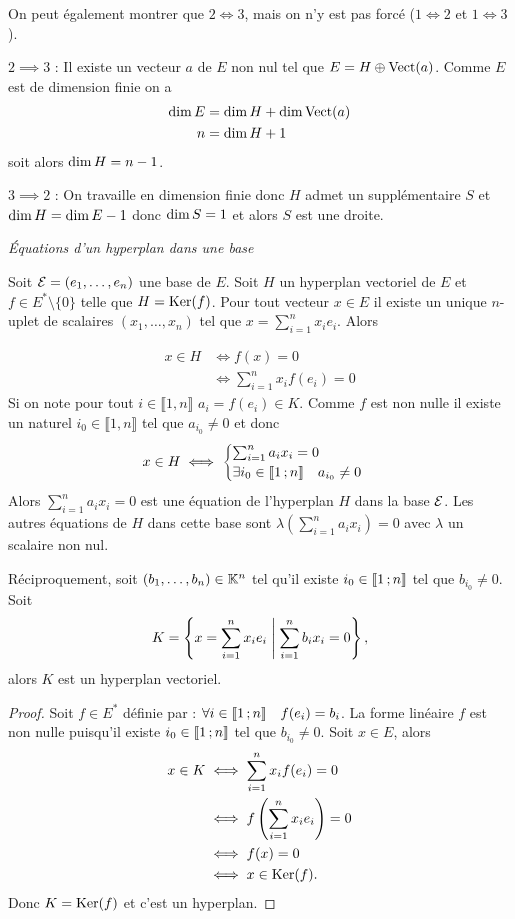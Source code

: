 On peut également montrer que \(2 \iff 3\), mais on n'y est pas forcé (\(1 \iff 2\) et \(1 \iff 3\)).

\(2 \implies 3\) : Il existe un vecteur \(a\) de \(E\) non nul tel que \(E=H \oplus \operatorname{Vect}(a)\). Comme \(E\) est de dimension finie on a
\begin{align}
  \operatorname{dim} E &= \operatorname{dim} H +\operatorname{dim} \operatorname{Vect}(a)\\
  n &= \operatorname{dim} H +1
\end{align}
soit alors \(\operatorname{dim} H = n-1\).

\(3 \implies 2\) : On travaille en dimension finie donc \(H\) admet un supplémentaire \(S\) et \(\operatorname{dim} H = \operatorname{dim} E -1\) donc \(\operatorname{dim} S=1\) et alors \(S\) est une droite.

\emph{Équations d'un hyperplan dans une base}

Soit \(\mathcal{E}=(e_1, \ldots, e_n)\) une base de \(E\). Soit \(H\) un hyperplan vectoriel de \(E\) et \(f \in E^*\setminus\{0\}\) telle que \(H=\operatorname{Ker}(f)\). Pour tout vecteur \(x \in E\) il existe un unique \(n\)-uplet de scalaires \((x_1,\ldots, x_n)\) tel que \(x = \sum_{i=1}^n x_i e_i\). Alors

\begin{align}
  x \in H &\iff f(x)=0\\
  &\iff \sum_{i=1}^n x_i f(e_i)=0
\end{align}
Si on note pour tout \(i \in \llbracket 1,n \rrbracket\) \(a_i=f(e_i) \in K\). Comme \(f\) est non nulle il existe un naturel \(i_0 \in \llbracket 1,n \rrbracket\) tel que \(a_{i_0} \neq 0\) et donc
\begin{equation}
  x \in H \iff
  \begin{cases}
    \sum_{i=1}^n a_i x_i=0 \\ \exists i_0 \in \mathopen{\llbracket}1\mathclose{}\mathpunct{};n\mathclose{\rrbracket} \quad a_{i_0} \neq 0
  \end{cases}
\end{equation}
Alors \(\sum_{i=1}^n a_i x_i=0\) est une équation de l'hyperplan \(H\) dans la base \(\mathcal{E}\). Les autres équations de \(H\) dans cette base sont \(\lambda \left(\sum_{i=1}^n a_i x_i\right)=0\) avec \(\lambda\) un scalaire non nul.

Réciproquement, soit \((b_1, \ldots, b_n) \in \mathbb{K}^n\) tel qu'il existe \(i_0 \in \mathopen{\llbracket}1\mathclose{}\mathpunct{};n\mathclose{\rrbracket}\) tel que \(b_{i_0} \neq 0\). Soit
\begin{equation}
  K = \left\{x = \sum_{i=1}^n x_i e_i\mathrel{}\middle|\mathrel{}\sum_{i=1}^n b_i x_i =0\right\},
\end{equation}
alors \(K\) est un hyperplan vectoriel.
\begin{proof}
  Soit \(f \in E^*\) définie par : \(\forall i \in \mathopen{\llbracket}1\mathclose{}\mathpunct{};n\mathclose{\rrbracket} \quad f(e_i)=b_i\). La forme linéaire \(f\) est non nulle puisqu'il existe \(i_0 \in \mathopen{\llbracket}1\mathclose{}\mathpunct{};n\mathclose{\rrbracket}\) tel que \(b_{i_0} \neq 0\). Soit \(x \in E\), alors
  \begin{align}
    x \in K &\iff \sum_{i=1}^n x_i f(e_i)=0 \\
    &\iff f\left(\sum_{i=1}^n x_i e_i \right) =0\\
    &\iff f(x)=0\\
    &\iff x \in \operatorname{Ker}(f).
  \end{align}
Donc \(K=\operatorname{Ker}(f)\) et c'est un hyperplan.
\end{proof}

